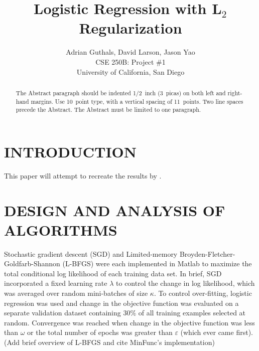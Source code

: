 
\title{Logistic Regression with L$_2$ Regularization}

\author{Adrian Guthals, David Larson, Jason Yao \\
CSE 250B: Project \#1 \\
University of California, San Diego \\
}




\maketitle


\begin{abstract}
The Abstract paragraph should be indented 1/2~inch (3~picas) on
both left and right-hand margins. Use 10~point type, with a
vertical spacing of 11~points. Two line spaces precede the Abstract.
The Abstract must be limited to one paragraph.
\end{abstract}





\section{INTRODUCTION}
\label{sec:intro}

This paper will attempt to recreate the results by \cite{t-logistic}.




\section{DESIGN AND ANALYSIS OF ALGORITHMS}
\label{sec:algorithms}
Stochastic gradient descent (SGD) and Limited-memory Broyden-Fletcher-Goldfarb-Shannon (L-BFGS) were each implemented in Matlab to maximize the total conditional log likelihood of each training data set. In brief, SGD incorporated a fixed learning rate $\lambda$ to control the change in log likelihood, which was averaged over random mini-batches of size $\kappa$. To control over-fitting, logistic regression was used and change in the objective function was evaluated on a separate validation dataset containing 30\% of all training examples selected at random. Convergence was reached when change in the objective function was less than $\omega$ or the total number of epochs was greater than $\varepsilon$ (which ever came first). (Add brief overview of L-BFGS and cite MinFunc's implementation)


